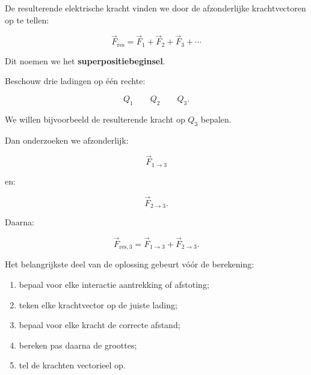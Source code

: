 \documentclass{ximera}
\begin{document}
De resulterende elektrische kracht vinden we door de afzonderlijke
krachtvectoren op te tellen:

\[
\boxed{
\vec F_\mathrm{res}
=
\vec F_1+\vec F_2+\vec F_3+\cdots
}
\]

Dit noemen we het \textbf{superpositiebeginsel}.




Beschouw drie ladingen op één rechte:

\[
Q_1
\qquad
Q_2
\qquad
Q_3.
\]

We willen bijvoorbeeld de resulterende kracht op $Q_3$ bepalen.

Dan onderzoeken we afzonderlijk:

\[
\vec F_{1\rightarrow3}
\]

en:

\[
\vec F_{2\rightarrow3}.
\]

Daarna:

\[
\boxed{
\vec F_{\mathrm{res},3}
=
\vec F_{1\rightarrow3}
+
\vec F_{2\rightarrow3}.
}
\]


Het belangrijkste deel van de oplossing gebeurt vóór de berekening:

\begin{enumerate}
  \item bepaal voor elke interactie aantrekking of afstoting;
  \item teken elke krachtvector op de juiste lading;
  \item bepaal voor elke kracht de correcte afstand;
  \item bereken pas daarna de groottes;
  \item tel de krachten vectorieel op.
\end{enumerate}


\end{document}
